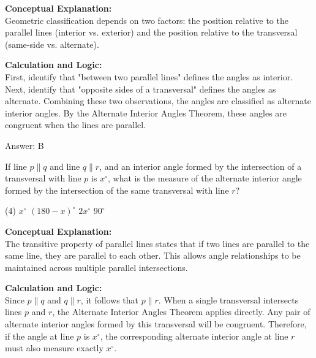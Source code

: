 \documentclass[11pt,paper=a4,answers]{exam}
\begin{document}
\begin{questions}
\begin{solution}
\textbf{Conceptual Explanation:} \\
Geometric classification depends on two factors: the position relative to the parallel lines (interior vs. exterior) and the position relative to the transversal (same-side vs. alternate).

\vspace{30pt}

\textbf{Calculation and Logic:} \\
First, identify that "between two parallel lines" defines the angles as interior. Next, identify that "opposite sides of a transversal" defines the angles as alternate. Combining these two observations, the angles are classified as alternate interior angles. By the Alternate Interior Angles Theorem, these angles are congruent when the lines are parallel.

\vspace{30pt}

Answer: \colorbox{yellow!100}{B}
\end{solution}

\vspace{60pt}

\question
If line $p \parallel q$ and line $q \parallel r$, and an interior angle formed by the intersection of a transversal with line $p$ is $x^\circ$, what is the measure of the alternate interior angle formed by the intersection of the same transversal with line $r$?
\begin{tasks}(4)
    \task $x^\circ$
    \task $(180-x)^\circ$
    \task $2x^\circ$
    \task $90^\circ$
\end{tasks}

\begin{solution}
\textbf{Conceptual Explanation:} \\
The transitive property of parallel lines states that if two lines are parallel to the same line, they are parallel to each other. This allows angle relationships to be maintained across multiple parallel intersections.

\vspace{30pt}

\textbf{Calculation and Logic:} \\
Since $p \parallel q$ and $q \parallel r$, it follows that $p \parallel r$. When a single transversal intersects lines $p$ and $r$, the Alternate Interior Angles Theorem applies directly. Any pair of alternate interior angles formed by this transversal will be congruent. Therefore, if the angle at line $p$ is $x^\circ$, the corresponding alternate interior angle at line $r$ must also measure exactly $x^\circ$.


\end{solution}
\end{questions}
\end{document}
